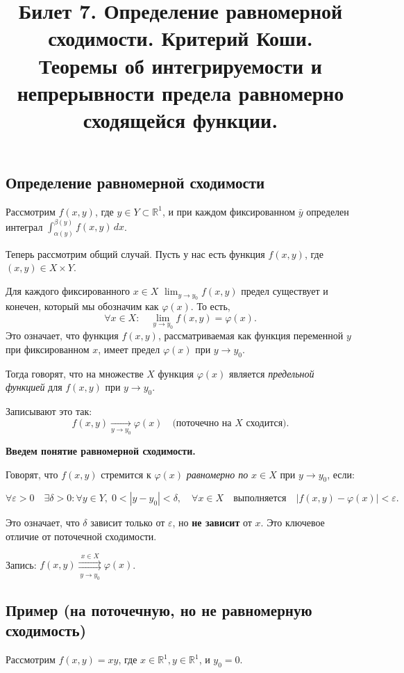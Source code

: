 \documentclass{article}
\title{ Билет 7. Определение равномерной сходимости. Критерий Коши. Теоремы об интегрируемости и
непрерывности предела равномерно сходящейся функции.}
\author{}
\date{}
\begin{document}
\maketitle

\subsection*{Определение равномерной сходимости}

Рассмотрим $f(x, y)$, где $y \in Y \subset \mathbb{R}^1$, и при каждом фиксированном $\bar{y}$ определен интеграл $\int_{\alpha(y)}^{\beta(y)} f(x, y) \, dx$.

Теперь рассмотрим общий случай. Пусть у нас есть функция $f(x, y)$, где $(x, y) \in X \times Y$.

Для каждого фиксированного $x \in X$ $\lim_{y \to y_0} f(x, y)$ предел существует и конечен, который мы обозначим как $\varphi(x)$. То есть,
\[
\forall x \in X : \quad \lim_{y \to y_0} f(x, y) = \varphi(x).
\]
Это означает, что функция $f(x, y)$, рассматриваемая как функция переменной $y$ при фиксированном $x$, имеет предел $\varphi(x)$ при $y \to y_0$.

Тогда говорят, что на множестве $X$ функция $\varphi(x)$ является \textit{предельной функцией} для $f(x, y)$ при $y \to y_0$.

Записывают это так:
\[
f(x, y) \xrightarrow[y \to y_0]{} \varphi(x) \quad \text{(поточечно на } X \text{ сходится)}.
\]

\textbf{Введем понятие равномерной сходимости.}

Говорят, что $f(x, y)$ стремится к $\varphi(x)$ \textit{равномерно по} $x \in X$ при $y \to y_0$, если:

\[
\boxed{
\forall \varepsilon > 0 \quad \exists \delta > 0 : \forall y \in Y, \; 0 < |y - y_0| < \delta, \quad \forall x \in X \quad \text{выполняется} \quad |f(x, y) - \varphi(x)| < \varepsilon.
}
\]

Это означает, что $\delta$ зависит только от $\varepsilon$, но \textbf{не зависит} от $x$. Это ключевое отличие от поточечной сходимости.

Запись: \quad $f(x, y) \mathop{\rightrightarrows}\limits^{ x \in X}_{\,y \to y_0\,} \varphi(x)$.


\subsection*{Пример (на поточечную, но не равномерную сходимость)}

Рассмотрим $f(x, y) = xy$, где $x \in \mathbb{R}^1, y \in \mathbb{R}^1$, и $y_0 = 0$.
\end{document}
